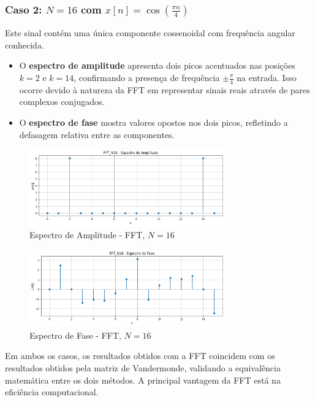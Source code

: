 \documentclass[12pt]{article}
\begin{document}
\subsubsection{Caso 2: $N = 16$ com $x[n] = \cos\left( \frac{\pi n}{4} \right)$}

Este sinal contém uma única componente cossenoidal com frequência angular conhecida.

\begin{itemize}
    \item O \textbf{espectro de amplitude} apresenta dois picos acentuados nas posições $k=2$ e $k=14$, confirmando a presença de frequência $\pm \frac{\pi}{4}$ na entrada. Isso ocorre devido à natureza da FFT em representar sinais reais através de pares complexos conjugados.
    \item O \textbf{espectro de fase} mostra valores opostos nos dois picos, refletindo a defasagem relativa entre as componentes.
\end{itemize}

\begin{figure}[H]
    \centering
    \includegraphics[width=0.75\textwidth]{imagens/FFT_N16_amplitude.png}
    \caption{Espectro de Amplitude - FFT, $N=16$}
\end{figure}

\begin{figure}[H]
    \centering
    \includegraphics[width=0.75\textwidth]{imagens/FFT_N16_fase.png}
    \caption{Espectro de Fase - FFT, $N=16$}
\end{figure}

Em ambos os casos, os resultados obtidos com a FFT coincidem com os resultados obtidos pela matriz de Vandermonde, validando a equivalência matemática entre os dois métodos. A principal vantagem da FFT está na eficiência computacional.
\end{document}
